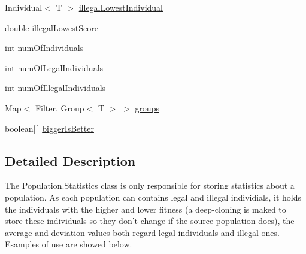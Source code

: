 \begin{DoxyCompactItemize}
\item 
Individual$<$ T $>$ \hyperlink{classjenes_1_1population_1_1_population_3_01_t_01extends_01_chromosome_01_4_1_1_statistics_3_01_t_01extends_01_chromosome_01_4_a96d063d61f3279a870c44c81c25327ba}{illegal\-Lowest\-Individual}
\item 
double \hyperlink{classjenes_1_1population_1_1_population_3_01_t_01extends_01_chromosome_01_4_1_1_statistics_3_01_t_01extends_01_chromosome_01_4_aa4f1eb3b36a1a153e8d73c17b01264e7}{illegal\-Lowest\-Score}
\item 
int \hyperlink{classjenes_1_1population_1_1_population_3_01_t_01extends_01_chromosome_01_4_1_1_statistics_3_01_t_01extends_01_chromosome_01_4_ab45a947186e072ff044e6f3e9fc08368}{num\-Of\-Individuals}
\item 
int \hyperlink{classjenes_1_1population_1_1_population_3_01_t_01extends_01_chromosome_01_4_1_1_statistics_3_01_t_01extends_01_chromosome_01_4_a238a663cf8c96804ff26d5224a1a7955}{num\-Of\-Legal\-Individuals}
\item 
int \hyperlink{classjenes_1_1population_1_1_population_3_01_t_01extends_01_chromosome_01_4_1_1_statistics_3_01_t_01extends_01_chromosome_01_4_a6b84c0f4b59c408bd18f55228f2aa75e}{num\-Of\-Illegal\-Individuals}
\item 
Map$<$ Filter, Group$<$ T $>$ $>$ \hyperlink{classjenes_1_1population_1_1_population_3_01_t_01extends_01_chromosome_01_4_1_1_statistics_3_01_t_01extends_01_chromosome_01_4_a2f565ff37ed70803d34dcc61227eafee}{groups}
\item 
boolean\mbox{[}$\,$\mbox{]} \hyperlink{classjenes_1_1population_1_1_population_3_01_t_01extends_01_chromosome_01_4_1_1_statistics_3_01_t_01extends_01_chromosome_01_4_a3033ce7fb2ca7d54edfc5d44f958e5c9}{bigger\-Is\-Better}
\end{DoxyCompactItemize}


\subsection{Detailed Description}
The {\ttfamily Population.\-Statistics} class is only responsible for storing statistics about a population. As each population can contains legal and illegal individials, it holds the individuals with the higher and lower fitness (a deep-\/cloning is maked to store these individuals so they don't change if the source population does), the average and deviation values both regard legal individuals and illegal ones. Esamples of use are showed below. 

